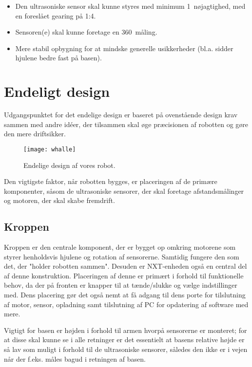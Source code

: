 \begin{itemize}
\item Den ultrasoniske sensor skal kunne styres med  minimum 1\degree~nøjagtighed, med en foreslået gearing på 1:4.
\item Sensoren(e) skal kunne foretage en 360\degree~måling.
\item Mere stabil opbygning for at mindske generelle usikkerheder (bl.a. sidder hjulene bedre fast på basen).
\end{itemize} 


\section{Endeligt design}
Udgangspunktet for det endelige design er baseret på ovenstående design krav sammen med andre idéer, der tilsammen skal øge præcisionen af robotten og gøre den mere driftsikker.

\begin{figure}
\centering
\texttt{[image: whalle]}
\caption{Endelige design af vores robot.}
\label{robot:opbygning}
\end{figure}

Den vigtigste faktor, når robotten bygges, er placeringen af de primære komponenter, såsom de ultrasoniske sensorer, der skal foretage afstandsmålinger og motoren, der skal skabe fremdrift.

\subsection{Kroppen}
Kroppen er den centrale komponent, der er bygget op omkring motorene som styrer henholdsvis hjulene og rotation af sensorerne. 
Samtidig fungere den som det, der "holder robotten sammen".
Desuden er NXT-enheden også en central del af denne konstruktion.
Placeringen af denne er primært i forhold til funktionelle behov, da der på fronten er knapper til at tænde/slukke og vælge indstillinger med.
Dens placering gør det også nemt at få adgang til dens porte for tilslutning af motor, sensor, opladning samt tilslutning af PC for opdatering af software med mere.

Vigtigt for basen er højden i forhold til armen hvorpå sensorerne er monteret; for at disse skal kunne se i alle retninger er det essentielt at basens relative højde er så lav som muligt i forhold til de ultrasoniske sensorer, således den ikke er i vejen når der f.eks. måles bagud i retningen af basen. 

